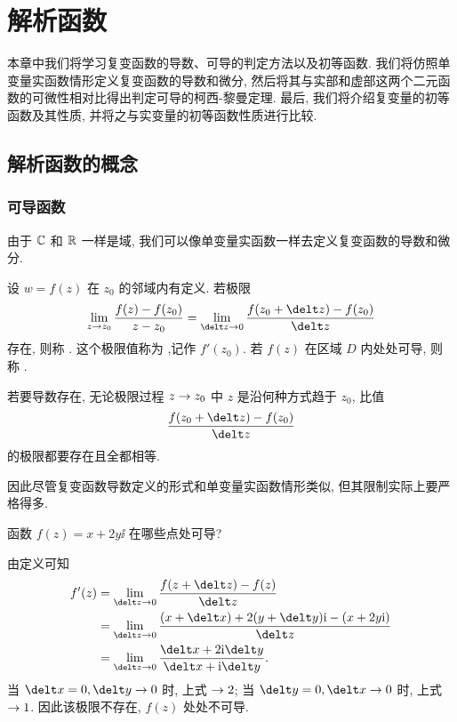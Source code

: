 \chapter{解析函数}
\label{chapter:2}

本章中我们将学习复变函数的导数、可导的判定方法以及初等函数.
我们将仿照单变量实函数情形定义复变函数的导数和微分, 然后将其与实部和虚部这两个二元函数的可微性相对比得出判定可导的柯西-黎曼定理.
最后, 我们将介绍复变量的初等函数及其性质, 并将之与实变量的初等函数性质进行比较.

\section{解析函数的概念}

\subsection{可导函数}

由于 ${\mathbb{C}}$ 和 ${\mathbb{R}}$ 一样是域, 我们可以像单变量实函数一样去定义复变函数的导数和微分.

\begin{definition}
  设 $w=f(z)$ 在 $z_0$ 的邻域内有定义.
  若极限
  \[
     \lim_{z\ra z_0}\frac{f(z)-f(z_0)}{z-z_0}
    =\lim_{\delt z\ra 0}\frac{f(z_0+\delt z)-f(z_0)}{\delt z}
  \]
  存在, 则称 .
  这个极限值称为 ,记作 $f'(z_0)$.
  若 $f(z)$ 在区域 $D$ 内处处可导, 则称 .\footnotemark
\end{definition}


\begin{marker}
  若要导数存在, 无论极限过程 $z\rightarrow z_0$ 中 $z$ 是沿何种方式趋于 $z_0$, 比值
  \[
    \frac{f(z_0+\delt z)-f(z_0)}{\delt z}
  \]
  的极限都要存在且全都相等.
\end{marker}

因此尽管复变函数导数定义的形式和单变量实函数情形类似, 但其限制实际上要严格得多.

\begin{example}
  函数 $f(z)=x+2y\ii$ 在哪些点处可导?
\end{example}

\begin{solution}
  由定义可知
  \begin{align*}
     f'(z)&
    =\lim_{\delt z\ra 0}\frac{f(z+\delt z)-f(z)}{\delt z}\\&
    =\lim_{\delt z\ra 0}\frac{(x+\delt x)+2(y+\delt y)\ii-(x+2y\ii)}{\delt z}\\&
    =\lim_{\delt z\ra 0}\frac{\delt x+2\ii\delt y}{\delt x+\ii\delt y}.
  \end{align*}
  当 $\delt x=0, \delt y\ra 0$ 时, 上式 $\rightarrow2$; 
  当 $\delt y=0, \delt x\ra 0$ 时, 上式 $\rightarrow1$.
  因此该极限不存在, $f(z)$ 处处不可导.
\end{solution}

